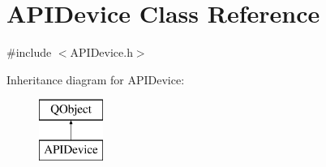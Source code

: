 \hypertarget{class_a_p_i_device}{}\section{A\+P\+I\+Device Class Reference}
\label{class_a_p_i_device}


{\ttfamily \#include $<$A\+P\+I\+Device.\+h$>$}

Inheritance diagram for A\+P\+I\+Device\+:\begin{figure}[H]
\begin{center}
\leavevmode
\includegraphics[height=2.000000cm]{class_a_p_i_device}
\end{center}
\end{figure}
